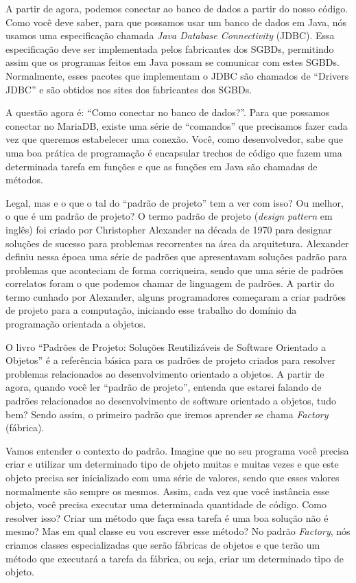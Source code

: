 A partir de agora, podemos conectar ao banco de dados a partir do nosso código. Como você deve saber, para que possamos usar um banco de dados em Java, nós usamos uma especificação chamada \textit{Java Database Connectivity} (JDBC). Essa especificação deve ser implementada pelos fabricantes dos SGBDs, permitindo assim que os programas feitos em Java possam se comunicar com estes SGBDs. Normalmente, esses pacotes que implementam o JDBC são chamados de ``Drivers JDBC'' e são obtidos nos sites dos fabricantes dos SGBDs.

A questão agora é: ``Como conectar no banco de dados?''. Para que possamos conectar no MariaDB, existe uma série de ``comandos'' que precisamos fazer cada vez que queremos estabelecer uma conexão. Você, como desenvolvedor, sabe que uma boa prática de programação é encapsular trechos de código que fazem uma determinada tarefa em funções e que as funções em Java são chamadas de métodos.

Legal, mas e o que o tal do ``padrão de projeto'' tem a ver com isso? Ou melhor, o que é um padrão de projeto? O termo padrão de projeto (\textit{design pattern} em inglês) foi criado por Christopher Alexander \cite{Alexander1977} na década de 1970 para designar soluções de sucesso para problemas recorrentes na área da arquitetura. Alexander definiu nessa época uma série de padrões que apresentavam soluções padrão para problemas que aconteciam de forma corriqueira, sendo que uma série de padrões correlatos foram o que podemos chamar de linguagem de padrões. A partir do termo cunhado por Alexander, alguns programadores começaram a criar padrões de projeto para a computação, iniciando esse trabalho do domínio da programação orientada a objetos.

O livro ``Padrões de Projeto: Soluções Reutilizáveis de Software Orientado a Objetos'' \cite{Gamma2000} é a referência básica para os padrões de projeto criados para resolver problemas relacionados ao desenvolvimento orientado a objetos. A partir de agora, quando você ler ``padrão de projeto'', entenda que estarei falando de padrões relacionados ao desenvolvimento de software orientado a objetos, tudo bem? Sendo assim, o primeiro padrão que iremos aprender se chama \textit{Factory} (fábrica). 

Vamos entender o contexto do padrão. Imagine que no seu programa você precisa criar e utilizar um determinado tipo de objeto muitas e muitas vezes e que este objeto precisa ser inicializado com uma série de valores, sendo que esses valores normalmente são sempre os mesmos. Assim, cada vez que você instância esse objeto, você precisa executar uma determinada quantidade de código. Como resolver isso? Criar um método que faça essa tarefa é uma boa solução não é mesmo? Mas em qual classe eu vou escrever esse método? No padrão \textit{Factory}, nós criamos classes especializadas que serão fábricas de objetos e que terão um método que executará a tarefa da fábrica, ou seja, criar um determinado tipo de objeto.

